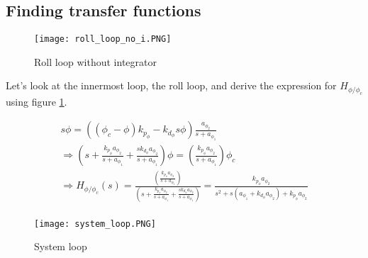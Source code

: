 \subsection{Finding transfer functions}

\begin{figure}[h!]
    \centering
    \texttt{[image: roll\_loop\_no\_i.PNG]}
    \caption{Roll loop without integrator}
    \label{fig:roll}
\end{figure}

Let's look at the innermost loop, the roll loop, and derive the expression for $H_{\phi/\phi_c}$ using figure \ref{fig:roll}.
\begin{equations}
    \begin{gather*}
        s \phi = ((\phi_c - \phi) k_{p_\phi}- k_{d_\phi}s \phi) \frac{a_{\phi_2}}{s + a_{\phi_1}} \\
        \Rightarrow (s + \frac{k_{p_\phi}a_{\phi_2}}{s + a_{\phi_1}} + \frac{ sk_{d_\phi}a_{\phi_2}}{s + a_{\phi_1}} ) \phi = (\frac{k_{p_\phi}a_{\phi_2}}{s + a_{\phi_1}})\phi_c \\
        \Rightarrow H_{\phi/\phi_c}(s)  = \frac{(\frac{k_{p_\phi}a_{\phi_2}}{s + a_{\phi_1}})}{ (s + \frac{k_{p_\phi}a_{\phi_2}}{s + a_{\phi_1}} + \frac{ sk_{d_\phi}a_{\phi_2}}{s + a_{\phi_1}} )}  
        = \frac{k_{p_\phi}a_{\phi_2}}{s^2 + s(a_{\phi_1} + k_{d_\phi} a_{\phi_2}) + k_{p_\phi}a_{\phi_2}} \\
    \end{gather*}
\end{equations}
 \begin{figure}[h!]
     \centering
     \texttt{[image: system\_loop.PNG]}
     \caption{System loop}
     \label{fig:system}
 \end{figure}

